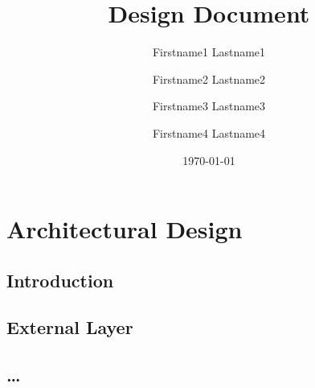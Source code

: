 \documentclass{book}
\title{Design Document}
\author{Firstname1 Lastname1 \and Firstname2 Lastname2 \and Firstname3
Lastname3 \and Firstname4 Lastname4}
\date{\today}
\begin{document}
\frontmatter
\maketitle
\tableofcontents
\mainmatter
\part{Architectural Design}

\chapter{Introduction}
 
\chapter{External Layer}

\chapter{\ldots}
 
\end{document}
